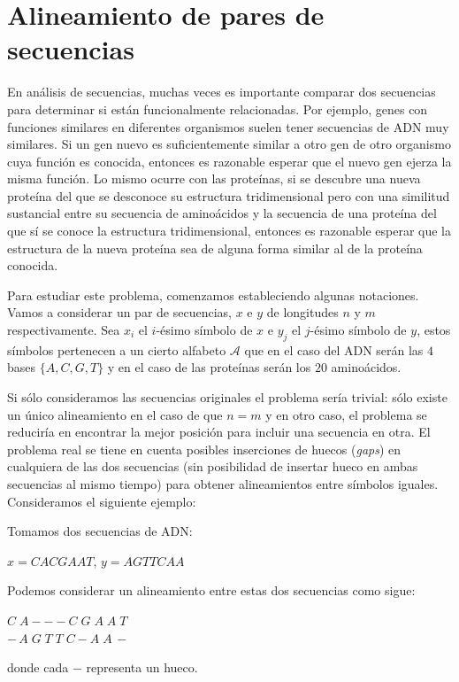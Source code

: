 \section{Alineamiento de pares de secuencias}
En análisis de secuencias, muchas veces es importante comparar dos secuencias para determinar si están funcionalmente relacionadas. Por ejemplo, genes con funciones similares en diferentes organismos suelen tener secuencias de ADN muy similares. Si un gen nuevo es suficientemente similar a otro gen de otro organismo cuya función es conocida, entonces es razonable esperar que el nuevo gen ejerza la misma función. Lo mismo ocurre con las proteínas, si se descubre una nueva proteína del que se desconoce su estructura tridimensional pero con una similitud sustancial entre su secuencia de aminoácidos y la secuencia de una proteína del que sí se conoce la estructura tridimensional, entonces es razonable esperar que la estructura de la nueva proteína sea de alguna forma similar al de la proteína conocida.

Para estudiar este problema, comenzamos estableciendo algunas notaciones. Vamos a considerar un par de secuencias, $x$ e $y$ de longitudes $n$ y $m$ respectivamente. Sea $x_i$ el $i$-ésimo símbolo de $x$ e $y_j$ el $j$-ésimo símbolo de $y$, estos símbolos pertenecen a un cierto alfabeto $\mathcal{A}$ que en el caso del ADN serán las $4$ bases $\{A,C,G,T\}$ y en el caso de las proteínas serán los $20$ aminoácidos.

Si sólo consideramos las secuencias originales el problema sería trivial: sólo existe un único alineamiento en el caso de que $n=m$ y en otro caso, el problema se reduciría en encontrar la mejor posición para incluir una secuencia en otra. El problema real se tiene en cuenta posibles inserciones de huecos (\textit{gaps}) en cualquiera de las dos secuencias (sin posibilidad de insertar hueco en ambas secuencias al mismo tiempo) para obtener alineamientos entre símbolos iguales. Consideramos el siguiente ejemplo:

\begin{exampleth}
    Tomamos dos secuencias de ADN:
    \begin{center}
        $x=CACGAAT$, $y=AGTTCAA$
    \end{center}
    Podemos considerar un alineamiento entre estas dos secuencias como sigue:
    \begin{center}
        $C\; A - - - C\; G\; A\; A\; T$ \\
        $-\, A\; G\; T\; T\; C - A\; A\, -$
    \end{center}
    donde cada $-$ representa un hueco.
\end{exampleth}

